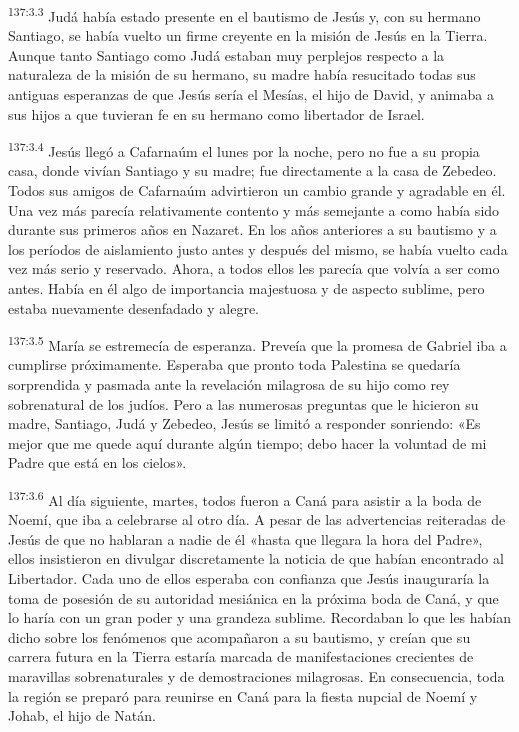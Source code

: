 \par 
\textsuperscript{137:3.3} Judá había estado presente en el bautismo de Jesús y, con su hermano Santiago, se había vuelto un firme creyente en la misión de Jesús en la Tierra. Aunque tanto Santiago como Judá estaban muy perplejos respecto a la naturaleza de la misión de su hermano, su madre había resucitado todas sus antiguas esperanzas de que Jesús sería el Mesías, el hijo de David, y animaba a sus hijos a que tuvieran fe en su hermano como libertador de Israel.

\par 
\textsuperscript{137:3.4} Jesús llegó a Cafarnaúm el lunes por la noche, pero no fue a su propia casa, donde vivían Santiago y su madre; fue directamente a la casa de Zebedeo. Todos sus amigos de Cafarnaúm advirtieron un cambio grande y agradable en él. Una vez más parecía relativamente contento y más semejante a como había sido durante sus primeros años en Nazaret. En los años anteriores a su bautismo y a los períodos de aislamiento justo antes y después del mismo, se había vuelto cada vez más serio y reservado. Ahora, a todos ellos les parecía que volvía a ser como antes. Había en él algo de importancia majestuosa y de aspecto sublime, pero estaba nuevamente desenfadado y alegre.

\par 
\textsuperscript{137:3.5} María se estremecía de esperanza. Preveía que la promesa de Gabriel iba a cumplirse próximamente. Esperaba que pronto toda Palestina se quedaría sorprendida y pasmada ante la revelación milagrosa de su hijo como rey sobrenatural de los judíos. Pero a las numerosas preguntas que le hicieron su madre, Santiago, Judá y Zebedeo, Jesús se limitó a responder sonriendo: «Es mejor que me quede aquí durante algún tiempo; debo hacer la voluntad de mi Padre que está en los cielos».

\par 
\textsuperscript{137:3.6} Al día siguiente, martes, todos fueron a Caná para asistir a la boda de Noemí, que iba a celebrarse al otro día. A pesar de las advertencias reiteradas de Jesús de que no hablaran a nadie de él «hasta que llegara la hora del Padre», ellos insistieron en divulgar discretamente la noticia de que habían encontrado al Libertador. Cada uno de ellos esperaba con confianza que Jesús inauguraría la toma de posesión de su autoridad mesiánica en la próxima boda de Caná, y que lo haría con un gran poder y una grandeza sublime. Recordaban lo que les habían dicho sobre los fenómenos que acompañaron a su bautismo, y creían que su carrera futura en la Tierra estaría marcada de manifestaciones crecientes de maravillas sobrenaturales y de demostraciones milagrosas. En consecuencia, toda la región se preparó para reunirse en Caná para la fiesta nupcial de Noemí y Johab, el hijo de Natán.

